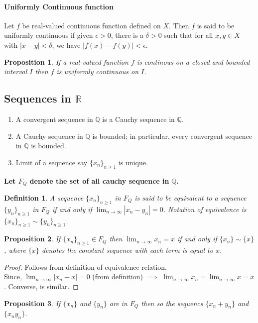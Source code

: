 \documentclass[12pt]{report}
\newtheorem{defn}{Definition}
\newtheorem{prop}{Proposition}
\begin{document}
\paragraph*{Uniformly Continuous function}
Let $f$ be real-valued continuous function defined on $X$. Then $f$ is said to be uniformly continuous if given $\epsilon > 0$, there is a $\delta > 0$ such that for all $x,y \in X$ with $|x - y| < \delta$, we have $|f(x) - f(y)| < \epsilon$.
\begin{prop}
    If a real-valued function $f$ is continous on a closed and bounded interval $I$ then $f$ is uniformly continuous on $I$.
\end{prop}
\subsection*{Sequences in $\mathbb{R}$}
\begin{enumerate}
    \item A convergent sequence in $\mathbb{Q}$ is a Cauchy sequence in $\mathbb{Q}$.
    \item A Cauchy sequence in $\mathbb{Q}$ is bounded; in particular, every convergent sequence in $\mathbb{Q}$ is bounded.
    \item Limit of a sequence say $\{x_n\}_{n \geq 1}$ is unique.
\end{enumerate}
\textbf{Let $F_Q$ denote the set of all cauchy sequence in $\mathbb{Q}$.}
\begin{defn}
    A sequence $\{x_n\}_{n \geq 1}$ in $F_Q$ is said to be equivalent to a sequence $\{y_n\}_{n \geq 1}$ in $F_Q$ if and only if $\lim_{n \to \infty}|x_n - y_n| = 0$. Notation of equivalence is $\{x_n\}_{n \geq 1} \sim \{y_n\}_{n \geq 1}$.
\end{defn}
\begin{prop}
    If $\{x_n\}_{n\geq 1} \in F_Q$ then $\lim_{n \to \infty} x_n = x$ if and only if $\{x_n\} \sim \{x\}$, where $\{x\}$ denotes the constant sequence with each term is equal to $x$. 
\end{prop}
\begin{proof}
    Follows from definition of equivalence relation.\\
    Since, $\lim_{n \to \infty} |x_n - x| = 0$ (from definition) $\implies$ $\lim_{n \to \infty} x_n =  \lim_{n \to \infty} x = x$. Converse, is similar. 
\end{proof}
\begin{prop}
    If $\{x_n\}$ and $\{y_n\}$ are in $F_Q$ then so the sequencs $\{x_n + y_n\}$ and $\{x_ny_n\}$.
\end{prop}
\end{document}
